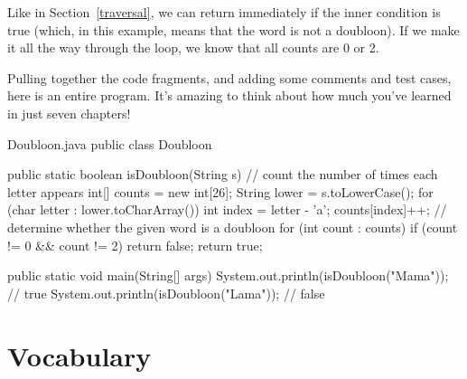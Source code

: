 Like in Section~\ref{traversal}, we can return immediately if the inner condition is true (which, in this example, means that the word is not a doubloon).
If we make it all the way through the  loop, we know that all counts are 0 or 2.

Pulling together the code fragments, and adding some comments and test cases, here is an entire program.
It's amazing to think about how much you've learned in just seven chapters!


\begin{trinket}{Doubloon.java}
public class Doubloon {

    public static boolean isDoubloon(String s) {
        // count the number of times each letter appears
        int[] counts = new int[26];
        String lower = s.toLowerCase();
        for (char letter : lower.toCharArray()) {
            int index = letter - 'a';
            counts[index]++;
        }
        // determine whether the given word is a doubloon
        for (int count : counts) {
            if (count != 0 && count != 2) {
                return false;
            }
        }
        return true;
    }

    public static void main(String[] args) {
        System.out.println(isDoubloon("Mama"));  // true
        System.out.println(isDoubloon("Lama"));  // false
    }
}
\end{trinket}


\section{Vocabulary}

